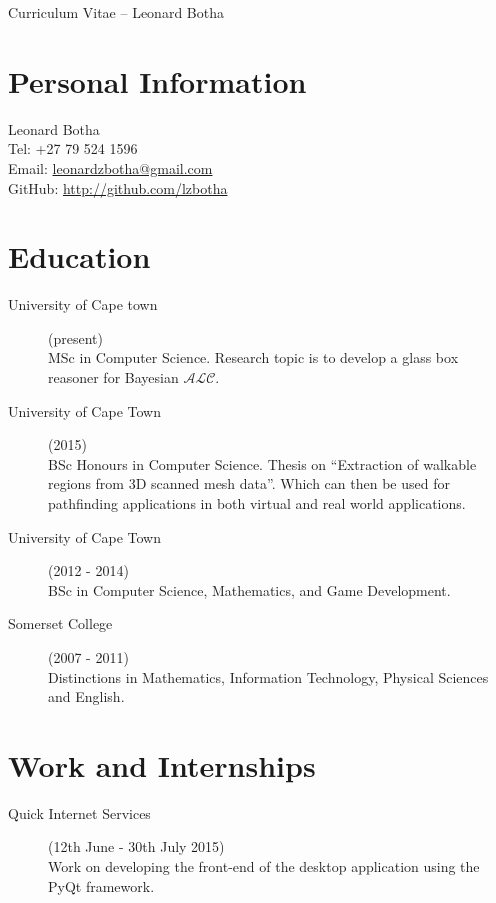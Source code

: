 \documentclass[margin,line,a4paper]{resume}
\begin{document}
    {\sc \Large Curriculum Vitae -- Leonard Botha}
    \begin{resume}
        \vspace{0.5cm}

        \section{\mysidestyle Personal Information}
            Leonard Botha\\
            Tel: +27 79 524 1596\\
            Email: \href{mailto:leonardzbotha@gmail.com}{leonardzbotha@gmail.com}\\
            GitHub: \href{http://github.com/lzbotha}{http://github.com/lzbotha}\\

        \section{\mysidestyle Education}
            \begin{description}
                \item[University of Cape town] (present)\\
                    MSc in Computer Science. Research topic is to develop a glass box reasoner for Bayesian $\mathcal{ALC}$.

                \item[University of Cape Town] (2015) \\
                    BSc Honours in Computer Science. Thesis on ``Extraction of  walkable regions from 3D scanned mesh data''.
                    Which can then be used for pathfinding applications in both virtual and real world applications.

                \item[University of Cape Town] (2012 - 2014) \\
                    BSc in Computer Science, Mathematics, and Game Development.

                \item[Somerset College](2007 - 2011)\\
                    Distinctions in Mathematics, Information Technology, Physical
Sciences and English.
            \end{description}


        \section{\mysidestyle Work and Internships}
            \begin{description}
                \item[Quick Internet Services] (12th June - 30th July 2015)\\
                    Work on developing the front-end of the desktop application using the PyQt framework.


\end{description}
\end{resume}
\end{document}
